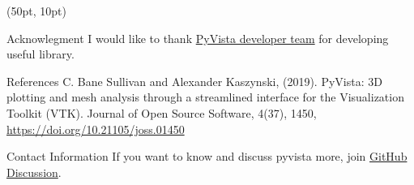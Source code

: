 \documentclass[aspectratio=169,12pt]{beamer}
\begin{document}
\begin{frame}[fragile]
\begin{textblock*}{350pt}(50pt, 10pt)
\begin{block}{Acknowlegment}
I would like to thank \href{https://github.com/orgs/pyvista/teams/developers}{PyVista developer team} for developing useful library.
\end{block}
\begin{block}{References}
C. Bane Sullivan and Alexander Kaszynski, (2019). PyVista: 3D plotting and mesh analysis through a streamlined interface for the Visualization Toolkit (VTK). Journal of Open Source Software, 4(37), 1450, \url{https://doi.org/10.21105/joss.01450}
\end{block}
\begin{block}{Contact Information}
If you want to know and discuss pyvista more, join \href{http://github.com/pyvista/pyvista/discussions}{GitHub Discussion}.
\end{block}
\doclicenseThis
\end{textblock*}
\end{frame}
\end{document}
